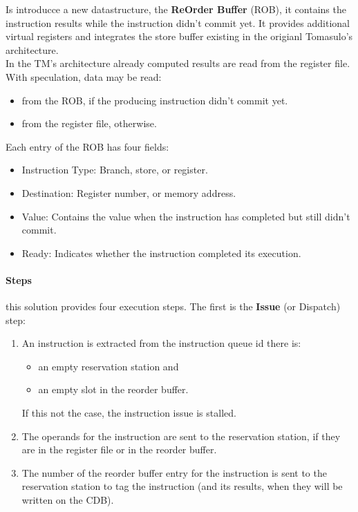 \documentclass[12pt]{article}
\begin{document}
Is introducce a new datastructure, the \textbf{ReOrder Buffer} (ROB), it contains the instruction results while the instruction didn't commit yet. It provides additional virtual registers and integrates the store buffer existing in the origianl Tomasulo's architecture.\\
In the TM's architecture already computed results are read from the register file. With speculation, data may be read:
\begin{itemize}
  \item from the ROB, if the producing instruction didn't commit yet.
  \item from the register file, otherwise.
\end{itemize}
Each entry of the ROB has four fields:
\begin{itemize}
  \item Instruction Type: Branch, store, or register.
  \item Destination: Register number, or memory address.
  \item Value: Contains the value when the instruction has completed but still didn't commit.
  \item Ready: Indicates whether the instruction completed its execution.
\end{itemize}

\paragraph{Steps} this solution provides four execution steps. The first is the \textbf{Issue} (or Dispatch) step:
\begin{enumerate}
  \item An instruction is extracted from the instruction queue id there is:
  \begin{itemize}
    \item an empty reservation station and
    \item an empty slot in the reorder buffer.
  \end{itemize}
  If this not the case, the instruction issue is stalled.
  \item The operands for the instruction are sent to the reservation station, if they are in the register file or in the reorder buffer.
  \item The number of the reorder buffer entry for the instruction is sent to the reservation station to tag the instruction (and its results, when they will be written on the CDB).
\end{enumerate}
\end{document}
